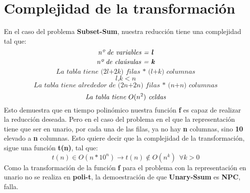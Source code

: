 \documentclass[../main]{subfiles}
\begin{document}
\section{Complejidad de la transformación}
En el caso del problema \textbf{Subset-Sum}, nuestra reducción tiene una complejidad tal que:\vspace{2mm}
\begin{equation*}
    \textit{nº de variables = \textbf{l}}
\end{equation*}
\begin{equation*}
    \textit{nº de claúsulas = \textbf{k}}
\end{equation*}
\begin{equation*}
    \textit{La tabla tiene (2l+2k) filas * (l+k) columnas}
\end{equation*}
\begin{equation*}
    \textit{l,k} < n 
\end{equation*}
\begin{equation*}
    \textit{La tabla tiene alrededor de (2n+2n) filas * (n+n) columnas}
\end{equation*}
\begin{equation*}
    \textit{La tabla tiene } O(n^2) \textit{ celdas}\vspace{2mm}
\end{equation*} 
Esto demuestra que en tiempo polinómico nuestra función \textbf{f} es capaz de realizar la reducción deseada. Pero en el caso del problema en el que la representación tiene que ser en unario, por cada una de las filas, ya no hay \textbf{n} columnas, sino \textbf{10} elevado a \textbf{n} columnas. Esto quiere decir que la complejidad de la transformación, sigue una función \textbf{t(n)}, tal que:
\begin{equation*}
    t(n) \in O(n*10^n) \rightarrow t(n) \notin O(n^k)\ \  \forall k > 0
\end{equation*}
Como la transformación de la función \textbf{f} para el problema con la representación en unario no se realiza en \textbf{poli-t}, la demoestración de que \textbf{Unary-Ssum} es \textbf{NPC}, falla.

    
\end{document}
